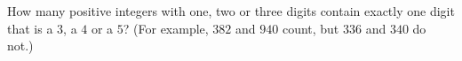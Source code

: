 How many positive integers with one, two or three digits contain exactly one digit that is a $3$, a $4$ or a $5$? (For example, $382$ and $940$ count, but $336$ and $340$ do not.)
